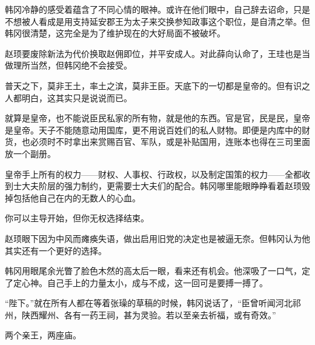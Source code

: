 韩冈冷静的感受着蕴含了不同心情的眼神。或许在他们眼中，自己辞去诏命，只是不想被人看成是用支持延安郡王为太子来交换参知政事这个职位，是自清之举。但韩冈很清楚，这完全是为了维护现在的大好局面不被破坏。

赵顼要废除新法为代价换取赵佣即位，并平安成人。对此薛向认命了，王珪也是当做理所当然，但韩冈绝不会接受。

普天之下，莫非王土，率土之滨，莫非王臣。天底下的一切都是皇帝的。但有识之人都明白，这其实只是说说而已。

就算是皇帝，也不能说臣民私家的所有物，就是他的东西。官是官，民是民，皇帝是皇帝。天子不能随意动用国库，更不用说百姓们的私人财物。即便是内库中的财货，也必须时不时拿出来赏赐百官、军队，或是补贴国用，连账本也得在三司里面放一个副册。

皇帝手上所有的权力——财权、人事权、行政权，以及制定国策的权力——全都收到士大夫阶层的强力制约，更需要士大夫们的配合。韩冈哪里能眼睁睁看着赵顼毁掉包括他自己在内的无数人的心血。

你可以主导开始，但你无权选择结束。

赵顼眼下因为中风而瘫痪失语，做出启用旧党的决定也是被逼无奈。但韩冈认为他其实还有一个更好的选择。

韩冈用眼尾余光瞥了脸色木然的高太后一眼，看来还有机会。他深吸了一口气，定了定心神。自己手上的力量太小，成与不成，这一回可是要搏一搏了。

“陛下。”就在所有人都在等着张璪的草稿的时候，韩冈说话了，“臣曾听闻河北祁州，陕西耀州、各有一药王祠，甚为灵验。若以至亲去祈福，或有奇效。”

两个亲王，两座庙。

